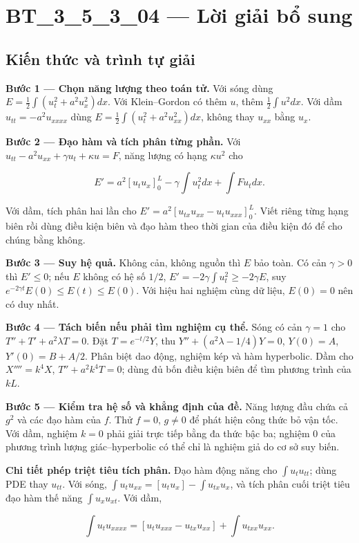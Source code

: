 \documentclass[10pt,a4paper]{article}
\begin{document}
\section*{BT\_3\_5\_3\_04 — Lời giải bổ sung}
\subsection*{Kiến thức và trình tự giải}
\textbf{Bước 1 — Chọn năng lượng theo toán tử.} Với sóng dùng $E=\frac12\int(u_t^2+a^2u_x^2)dx$. Với Klein–Gordon có thêm $u$, thêm $\frac12\int u^2dx$. Với dầm $u_{tt}=-a^2u_{xxxx}$ dùng $E=\frac12\int(u_t^2+a^2u_{xx}^2)dx$, không thay $u_{xx}$ bằng $u_x$.

\textbf{Bước 2 — Đạo hàm và tích phân từng phần.} Với $u_{tt}-a^2u_{xx}+\gamma u_t+\kappa u=F$, năng lượng có hạng $\kappa u^2$ cho


\[
E'=a^2[u_tu_x]_0^L-\gamma\int u_t^2dx+\int Fu_tdx.
\]


Với dầm, tích phân hai lần cho $E'=a^2[u_{tx}u_{xx}-u_tu_{xxx}]_0^L$. Viết riêng từng hạng biên rồi dùng điều kiện biên và đạo hàm theo thời gian của điều kiện đó để cho chúng bằng không.

\textbf{Bước 3 — Suy hệ quả.} Không cản, không nguồn thì $E$ bảo toàn. Có cản $\gamma>0$ thì $E'\le0$; nếu $E$ không có hệ số $1/2$, $E'=-2\gamma\int u_t^2\ge-2\gamma E$, suy $e^{-2\gamma t}E(0)\le E(t)\le E(0)$. Với hiệu hai nghiệm cùng dữ liệu, $E(0)=0$ nên có duy nhất.

\textbf{Bước 4 — Tách biến nếu phải tìm nghiệm cụ thể.} Sóng có cản $\gamma=1$ cho $T''+T'+a^2\lambda T=0$. Đặt $T=e^{-t/2}Y$, thu $Y''+(a^2\lambda-1/4)Y=0$, $Y(0)=A$, $Y'(0)=B+A/2$. Phân biệt dao động, nghiệm kép và hàm hyperbolic. Dầm cho $X''''=k^4X$, $T''+a^2k^4T=0$; dùng đủ bốn điều kiện biên để tìm phương trình của $kL$.

\textbf{Bước 5 — Kiểm tra hệ số và khẳng định của đề.} Năng lượng đầu chứa cả $g^2$ và các đạo hàm của $f$. Thử $f=0$, $g\ne0$ để phát hiện công thức bỏ vận tốc. Với dầm, nghiệm $k=0$ phải giải trực tiếp bằng đa thức bậc ba; nghiệm $0$ của phương trình lượng giác–hyperbolic có thể chỉ là nghiệm giả do cơ sở suy biến.

\textbf{Chi tiết phép triệt tiêu tích phân.} Đạo hàm động năng cho $\int u_tu_{tt}$; dùng PDE thay $u_{tt}$. Với sóng, $\int u_tu_{xx}=[u_tu_x]-\int u_{tx}u_x$, và tích phân cuối triệt tiêu đạo hàm thế năng $\int u_xu_{xt}$. Với dầm,


\[
\int u_tu_{xxxx}=[u_tu_{xxx}-u_{tx}u_{xx}]+\int u_{txx}u_{xx}.
\]
\end{document}
